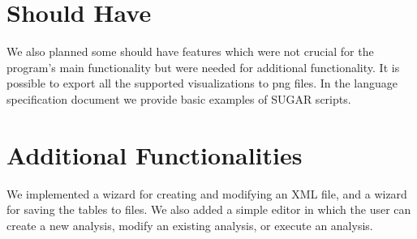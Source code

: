 \section{Should Have}
We also planned some should have features which were not crucial for the program's main functionality but were needed for additional functionality. It is possible to export all the supported visualizations to png files. In the language specification document we provide basic examples of SUGAR scripts.

\section{Additional Functionalities}
We implemented  a wizard for creating and modifying an XML file, and a wizard for saving the tables to files. We also added a simple editor in which the user can create a new analysis, modify an existing analysis, or execute an analysis.